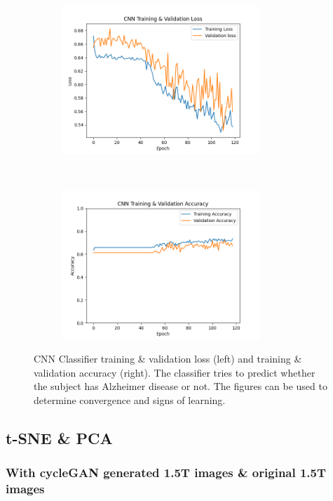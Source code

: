 \documentclass[12pt, fleqn, titlepage]{article}
\newcommand{\1}[1]{\mathds{1}\left[#1\right]}
\begin{document}
\begin{figure}[H]
	\centering
	\begin{subfigure}[t]{0.5\textwidth}
		\centering
		\includegraphics[height=2.2in]{imgs/classifier/lr_0.0002_loss_curve}%
	\end{subfigure}%
	~
	\begin{subfigure}[t]{0.5\textwidth}
	\centering
	\includegraphics[height=2.2in]{imgs/classifier/lr_0.0002_accuracy_curve}%

\end{subfigure}
	\label{fig:loss_acc}
	\caption{CNN Classifier training \& validation loss (left) and training \& validation accuracy (right). The classifier tries to predict whether the subject has Alzheimer disease or not. The figures can be used to determine convergence and signs of learning. }
\end{figure} \newpage
\subsection{t-SNE \& PCA}

\subsubsection{With cycleGAN generated 1.5T images \& original 1.5T images }
\end{document}
